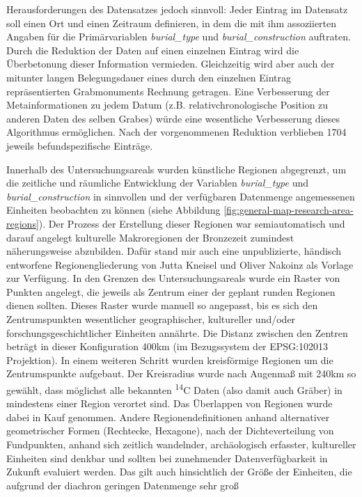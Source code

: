 \documentclass[openany,twoside,twocolumn]{book}
\begin{document}
Herausforderungen des Datensatzes jedoch sinnvoll: Jeder Eintrag im
Datensatz soll einen Ort und einen Zeitraum definieren, in dem die mit
ihm assoziierten Angaben für die Primärvariablen \emph{burial\_type} und
\emph{burial\_construction} auftraten. Durch die Reduktion der Daten auf
einen einzelnen Eintrag wird die Überbetonung dieser Information
vermieden. Gleichzeitig wird aber auch der mitunter langen
Belegungsdauer eines durch den einzelnen Eintrag repräsentierten
Grabmonuments Rechnung getragen. Eine Verbesserung der Metainformationen
zu jedem Datum (z.B. relativchronologische Position zu anderen Daten des
selben Grabes) würde eine wesentliche Verbesserung dieses Algorithmus
ermöglichen. Nach der vorgenommenen Reduktion verblieben 1704 jeweils
befundspezifische Einträge.

Innerhalb des Untersuchungsareals wurden künstliche Regionen abgegrenzt,
um die zeitliche und räumliche Entwicklung der Variablen
\emph{burial\_type} und \emph{burial\_construction} in sinnvollen und
der verfügbaren Datenmenge angemessenen Einheiten beobachten zu können
(siehe Abbildung \ref{fig:general-map-research-area-regions}). Der
Prozess der Erstellung dieser Regionen war semiautomatisch und darauf
angelegt kulturelle Makroregionen der Bronzezeit zumindest
näherungsweise abzubilden. Dafür stand mir auch eine unpublizierte,
händisch entworfene Regionengliederung von Jutta Kneisel und Oliver
Nakoinz als Vorlage zur Verfügung. In den Grenzen des
Untersuchungsareals wurde ein Raster von Punkten angelegt, die jeweils
als Zentrum einer der geplant runden Regionen dienen sollten. Dieses
Raster wurde manuell so angepasst, bis es sich den Zentrumspunkten
wesentlicher geographischer, kultureller und/oder
forschungsgeschichtlicher Einheiten annährte. Die Distanz zwischen den
Zentren beträgt in dieser Konfiguration 400km (im Bezugssystem der
EPSG:102013 Projektion). In einem weiteren Schritt wurden kreisförmige
Regionen um die Zentrumspunkte aufgebaut. Der Kreisradius wurde nach
Augenmaß mit 240km so gewählt, dass möglichst alle bekannten
\textsuperscript{14}C Daten (also damit auch Gräber) in mindestens einer
Region verortet sind. Das Überlappen von Regionen wurde dabei in Kauf
genommen. Andere Regionendefinitionen anhand alternativer geometrischer
Formen (Rechtecke, Hexagone), nach der Dichteverteilung von Fundpunkten,
anhand sich zeitlich wandelnder, archäologisch erfasster, kultureller
Einheiten sind denkbar und sollten bei zunehmender Datenverfügbarkeit in
Zukunft evaluiert werden. Das gilt auch hinsichtlich der Größe der
Einheiten, die aufgrund der diachron geringen Datenmenge sehr groß
\end{document}

